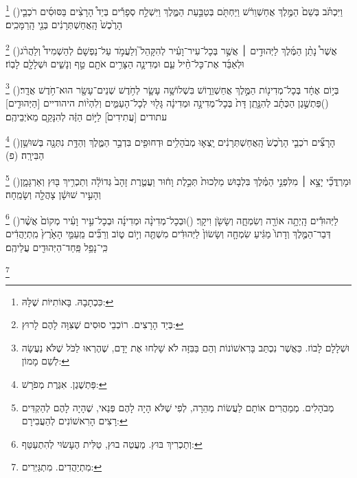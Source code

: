 \documentclass[12pt, openany]{book}
\newcommand{\footnotecomment}[1]{
	\renewcommand\thefootnote{}
	\footnote{#1}}
\newcommand{\commenta}[1]{\footnotecomment{#1}\hspace{0em}}
\newcommand{\vsnum}[1]{(\hebrewnumeral{#1})\space}
\begin{document}
{\commenta{כִּכְתָבָהּ. בָּאוֹתִיּוֹת שֶׁלָּהּ:}%
\vsnum{10}וַיִּכְתֹּ֗ב בְּשֵׁם֙ הַמֶּ֣לֶךְ אֲחַשְׁוֵרֹ֔שׁ וַיַּחְתֹּ֖ם בְּטַבַּ֣עַת הַמֶּ֑לֶךְ וַיִּשְׁלַ֣ח סְפָרִ֡ים בְּיַד֩ הָרָצִ֨ים בַּסּוּסִ֜ים רֹכְבֵ֤י הָרֶ֙כֶשׁ֙ הָֽאֲחַשְׁתְּרָנִ֔ים בְּנֵ֖י הָֽרַמָּכִֽים׃%
\commenta{בְּיַד הָרָצִים. רוֹכְבֵי סוּסִים שֶׁצִּוָּה לָהֶם לָרוּץ:}%
\vsnum{11}אֲשֶׁר֩ נָתַ֨ן הַמֶּ֜לֶךְ לַיְּהוּדִ֣ים ׀ אֲשֶׁ֣ר בְּכָל־עִיר־וָעִ֗יר לְהִקָּהֵל֮ וְלַעֲמֹ֣ד עַל־נַפְשָׁם֒ לְהַשְׁמִיד֩ וְלַהֲרֹ֨ג וּלְאַבֵּ֜ד אֶת־כָּל־חֵ֨יל עַ֧ם וּמְדִינָ֛ה הַצָּרִ֥ים אֹתָ֖ם טַ֣ף וְנָשִׁ֑ים וּשְׁלָלָ֖ם לָבֽוֹז׃%
\commenta{וּשְׁלָלָם לָבוֹז. כַּאֲשֶׁר נִכְתַּב בָּרִאשׁוֹנוֹת וְהֵם בַּבִּזָּה לֹא שָׁלְחוּ אֶת יָדָם, שֶׁהֶרְאוּ לַכֹּל שֶׁלֹּא נַעֲשָׂה לְשֵׁם מָמוֹן: }%
\vsnum{12}בְּי֣וֹם אֶחָ֔ד בְּכָל־מְדִינ֖וֹת הַמֶּ֣לֶךְ אֲחַשְׁוֵר֑וֹשׁ בִּשְׁלוֹשָׁ֥ה עָשָׂ֛ר לְחֹ֥דֶשׁ שְׁנֵים־עָשָׂ֖ר הוּא־חֹ֥דֶשׁ אֲדָֽר׃
\vsnum{13}פַּתְשֶׁ֣גֶן הַכְּתָ֗ב לְהִנָּ֤תֵֽן דָּת֙ בְּכָל־מְדִינָ֣ה וּמְדִינָ֔ה גָּל֖וּי לְכָל־הָעַמִּ֑ים וְלִהְי֨וֹת היהודיים [הַיְּהוּדִ֤ים] עתודים [עֲתִידִים֙] לַיּ֣וֹם הַזֶּ֔ה לְהִנָּקֵ֖ם מֵאֹיְבֵיהֶֽם׃%
\commenta{פַּתְשֶׁגֶן. אִגֶּרֶת מְפֹרָשׁ:}%
\vsnum{14}הָרָצִ֞ים רֹכְבֵ֤י הָרֶ֙כֶשׁ֙ הָֽאֲחַשְׁתְּרָנִ֔ים יָֽצְא֛וּ מְבֹהָלִ֥ים וּדְחוּפִ֖ים בִּדְבַ֣ר הַמֶּ֑לֶךְ וְהַדָּ֥ת נִתְּנָ֖ה בְּשׁוּשַׁ֥ן הַבִּירָֽה׃ (פ)%
\commenta{מְבֹהָלִים. מְמַהֲרִים אוֹתָם לַעֲשׂוֹת מְהֵרָה, לְפִי שֶׁלֹּא הָיָה לָהֶם פְּנַאי, שֶׁהָיָה לָהֶם לְהַקְדִּים רָצִים הָרִאשׁוֹנִים לְהַעֲבִירָם: }%
\vsnum{15}וּמָרְדֳּכַ֞י יָצָ֣א ׀ מִלִּפְנֵ֣י הַמֶּ֗לֶךְ בִּלְב֤וּשׁ מַלְכוּת֙ תְּכֵ֣לֶת וָח֔וּר וַעֲטֶ֤רֶת זָהָב֙ גְּדוֹלָ֔ה וְתַכְרִ֥יךְ בּ֖וּץ וְאַרְגָּמָ֑ן וְהָעִ֣יר שׁוּשָׁ֔ן צָהֲלָ֖ה וְשָׂמֵֽחָה׃%
\commenta{וְתַכְרִיךְ בּוּץ. מַעֲטֵה בוּץ, טַלִּית הֶעָשׂוּי לְהִתְעַטֵּף: }%
\vsnum{16}לַיְּהוּדִ֕ים הָֽיְתָ֥ה אוֹרָ֖ה וְשִׂמְחָ֑ה וְשָׂשֹׂ֖ן וִיקָֽר׃
\vsnum{17}וּבְכָל־מְדִינָ֨ה וּמְדִינָ֜ה וּבְכָל־עִ֣יר וָעִ֗יר מְקוֹם֙ אֲשֶׁ֨ר דְּבַר־הַמֶּ֤לֶךְ וְדָתוֹ֙ מַגִּ֔יעַ שִׂמְחָ֤ה וְשָׂשׂוֹן֙ לַיְּהוּדִ֔ים מִשְׁתֶּ֖ה וְי֣וֹם ט֑וֹב וְרַבִּ֞ים מֵֽעַמֵּ֤י הָאָ֙רֶץ֙ מִֽתְיַהֲדִ֔ים כִּֽי־נָפַ֥ל פַּֽחַד־הַיְּהוּדִ֖ים עֲלֵיהֶֽם׃%
\commenta{מִתְיַהֲדִים. מִתְגַּיְּרִים:}%
\clearpage}
\end{document}
